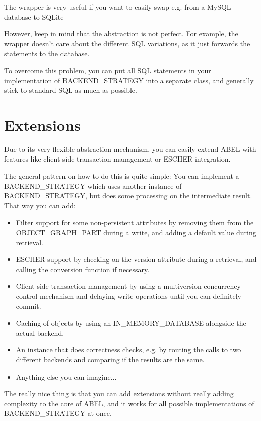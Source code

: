The wrapper is very useful if you want to easily swap e.g. from a MySQL database to SQLite

However, keep in mind that the abstraction is not perfect. 
For example, the wrapper doesn't care about the different SQL variations, as it just forwards the statements to the database.

To overcome this problem, you can put all SQL statements in your implementation of BACKEND\_STRATEGY into a separate class, and generally stick to standard SQL as much as possible.


\section{Extensions}

Due to its very flexible abstraction mechanism, you can easily extend ABEL with features like client-side transaction management or ESCHER \cite {escher} integration.

The general pattern on how to do this is quite simple: 
You can implement a BACKEND\_STRATEGY which uses another instance of BACKEND\_STRATEGY, but does some processing on the intermediate result.
That way you can add:

\begin{itemize}
 \item Filter support for some non-persistent attributes by removing them from the OBJECT\_GRAPH\_PART during a write, and adding a default value during retrieval.
 \item ESCHER support by checking on the version attribute during a retrieval, and calling the conversion function if necessary.
 \item Client-side transaction management by using a multiversion concurrency control mechanism and delaying write operations until you can definitely commit.
 \item Caching of objects by using an IN\_MEMORY\_DATABASE alongside the actual backend.
 \item An instance that does correctness checks, e.g. by routing the calls to two different backends and comparing if the results are the same.
 \item Anything else you can imagine...
\end{itemize}

The really nice thing is that you can add extensions without really adding complexity to the core of ABEL, and it works for all possible implementations of BACKEND\_STRATEGY at once.


